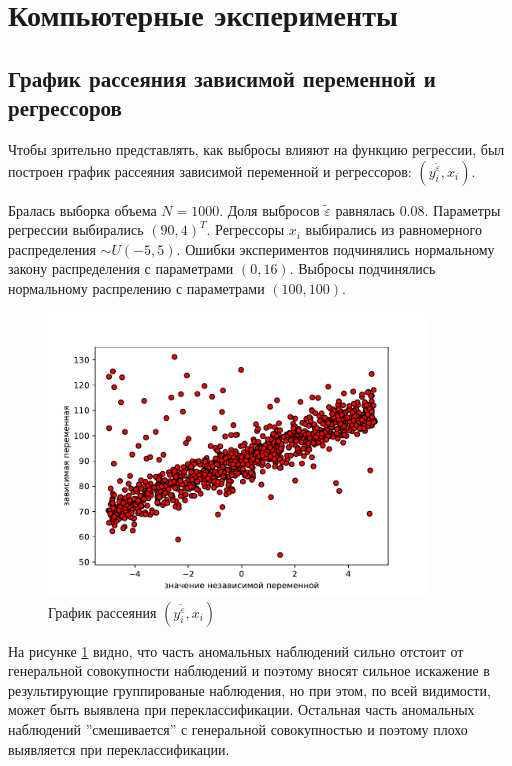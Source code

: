 \section{Компьютерные эксперименты}\label{sec_exp}
\subsection{График рассеяния зависимой переменной и регрессоров}
Чтобы зрительно представлять, как выбросы влияют на функцию регрессии, был построен график рассеяния зависимой переменной и регрессоров: $(y_i^{\widetilde{\varepsilon}}, x_i)$.

Бралась выборка объема $N = 1000$. Доля выбросов $\widetilde{\varepsilon}$ равнялась $0.08$. 
Параметры регрессии выбирались $(90, 4)^T$. 
Регрессоры $x_i$ выбирались из равномерного распределения $\sim U(-5,5)$. 
Ошибки экспериментов подчинялись нормальному закону распределения с параметрами $(0, 16)$. Выбросы подчинялись нормальному распрелению с параметрами $(100, 100)$. 

\begin{figure}[h!]
    \centering
    \includegraphics[width=100mm]{../images/scatter.pdf}
    \caption{График рассеяния $(y_i^{\widetilde{\varepsilon}}, x_i)$\label{overflow}}
    \label{pic_scatter}
\end{figure}

На рисунке \ref{pic_scatter} видно, что часть аномальных наблюдений сильно отстоит от генеральной совокупности наблюдений и поэтому вносят сильное искажение в результирующие группированые наблюдения, но при этом, по всей видимости, может быть выявлена при переклассификации.
Остальная часть аномальных наблюдений ''смешивается'' с генеральной совокупностью и поэтому плохо выявляется при переклассификации.

\newpage


